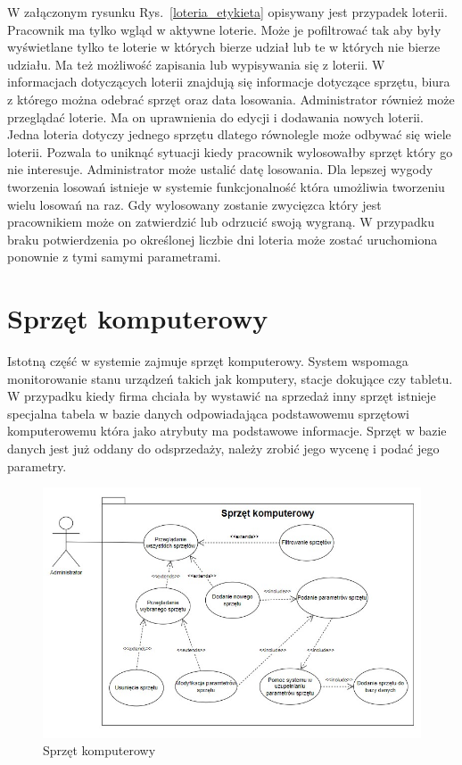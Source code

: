 W załączonym rysunku Rys.~\ref{loteria_etykieta} opisywany jest przypadek loterii. Pracownik ma tylko wgląd w aktywne loterie. Może je pofiltrować tak aby były wyświetlane tylko te loterie w których bierze udział lub te w których nie bierze udziału. Ma też możliwość zapisania lub wypisywania się z loterii. W informacjach dotyczących loterii znajdują się informacje dotyczące sprzętu, biura z którego można odebrać sprzęt oraz data losowania. Administrator również może przeglądać loterie. Ma on uprawnienia do edycji i dodawania nowych loterii. Jedna loteria dotyczy jednego sprzętu dlatego równolegle może odbywać się wiele loterii. Pozwala to uniknąć sytuacji kiedy pracownik wylosowałby sprzęt który go nie interesuje. Administrator może ustalić datę losowania. Dla lepszej wygody tworzenia losowań istnieje w systemie funkcjonalność która umożliwia tworzeniu wielu losowań na raz. Gdy wylosowany zostanie zwycięzca który jest pracownikiem może on zatwierdzić lub odrzucić swoją wygraną. W przypadku braku potwierdzenia po określonej liczbie dni loteria może zostać uruchomiona ponownie z tymi samymi parametrami.

\section {Sprzęt komputerowy}

Istotną część w systemie zajmuje sprzęt komputerowy. System wspomaga monitorowanie stanu urządzeń takich jak komputery, stacje dokujące czy tabletu. W przypadku kiedy firma chciała by wystawić na sprzedaż inny sprzęt istnieje specjalna tabela w bazie danych odpowiadająca podstawowemu sprzętowi komputerowemu która jako atrybuty ma podstawowe informacje. Sprzęt w bazie danych jest już oddany do odsprzedaży, należy zrobić jego wycenę i podać jego parametry.

\begin{figure}[h]
    \includegraphics[scale=0.8]{rys01/sprzet.jpg}
    \caption{Sprzęt komputerowy}
    \label{sprzet_etykieta}
\end{figure}


